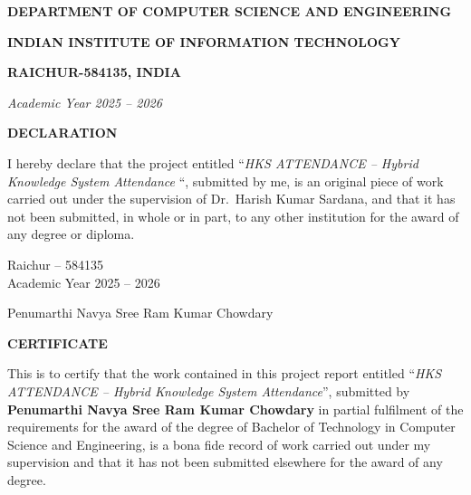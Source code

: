 \documentclass[12pt, a4paper, oneside]{report}
\newcommand{\thesisTitle}{HKS ATTENDANCE -- Hybrid Knowledge System Attendance}
\newcommand{\studentName}{Penumarthi Navya Sree Ram Kumar Chowdary}
\newcommand{\supervisorName}{Dr.~Harish Kumar Sardana}
\newcommand{\departmentName}{Computer Science and Engineering}
\newcommand{\submissionMonthYear}{Academic Year 2025 -- 2026}
\newcommand{\submissionLocation}{Raichur -- 584135}
\newcommand{\degreeName}{Bachelor of Technology}
\newcommand{\logoPath}{images/iiitr_logo.png}
\newcommand{\frontmatterheading}[1]{%
  \begin{center}\Large\bfseries #1\end{center}
  \vspace{0.5cm}
}
\begin{document}
\begin{titlepage}
    \vspace{0.5cm}

    {\normalsize\bfseries DEPARTMENT OF \MakeUppercase{\departmentName} \par}
    {\normalsize\bfseries INDIAN INSTITUTE OF INFORMATION TECHNOLOGY \par}
    {\normalsize\bfseries RAICHUR-584135, INDIA \par}
    \vspace{0.4cm}

    {\normalsize\itshape \submissionMonthYear \par}

\end{titlepage}

\setcounter{page}{2}

\clearpage
\thispagestyle{plain}
\frontmatterheading{DECLARATION}

\noindent I hereby declare that the project entitled ``\textit{\thesisTitle} ``, submitted by me, is an original piece of work carried out under the supervision of \supervisorName{}, and that it has not been submitted, in whole or in part, to any other institution for the award of any degree or diploma.

\vspace{2.5cm}
\noindent
\begin{minipage}[t]{0.45\textwidth}
\submissionLocation \\
\submissionMonthYear
\end{minipage}
\hfill
\begin{minipage}[t]{0.45\textwidth}
\raggedleft
\studentName
\end{minipage}

\clearpage
\thispagestyle{plain}
\frontmatterheading{CERTIFICATE}

\noindent This is to certify that the work contained in this project report entitled ``\textit{\thesisTitle}'', submitted by \textbf{\studentName} in partial fulfilment of the requirements for the award of the degree of \degreeName{} in \departmentName{}, is a bona fide record of work carried out under my supervision and that it has not been submitted elsewhere for the award of any degree.
\end{document}
